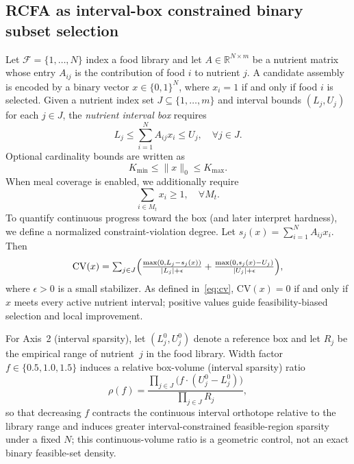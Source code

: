 \documentclass[lettersize,journal]{IEEEtran}
\begin{document}
\subsection{RCFA as interval-box constrained binary subset selection}
Let $\mathcal{F}=\{1,\ldots,N\}$ index a food library and let $A\in\mathbb{R}^{N\times m}$ be a nutrient matrix whose entry $A_{ij}$ is the contribution of food $i$ to nutrient $j$.
A candidate assembly is encoded by a binary vector $x\in\{0,1\}^N$, where $x_i=1$ if and only if food $i$ is selected.
Given a nutrient index set $J\subseteq\{1,\ldots,m\}$ and interval bounds $(L_j,U_j)$ for each $j\in J$, the \emph{nutrient interval box} requires\hspace{\fill}
\begin{equation}
\textstyle
L_j \le \sum_{i=1}^{N} A_{ij}x_i \le U_j,\quad \forall j\in J.
\end{equation}
Optional cardinality bounds are written as\hspace{\fill}
\begin{equation}
K_{\min}\le \|x\|_0\le K_{\max}.
\end{equation}
When meal coverage is enabled, we additionally require\hspace{\fill}
\begin{equation}
\textstyle
\sum_{i\in M_t} x_i \ge 1,\quad \forall M_t.
\label{eq:meal}
\end{equation}
To quantify continuous progress toward the box (and later interpret hardness), we define a normalized constraint-violation degree.
Let $s_j(x)=\sum_{i=1}^{N}A_{ij}x_i$. Then\hspace{\fill}
\begin{equation}
\textstyle
\mathrm{CV}(x)
=
\sum_{j\in J}
\Bigl(
\tfrac{\max(0,L_j-s_j(x))}{|L_j|+\epsilon}
+
\tfrac{\max(0,s_j(x)-U_j)}{|U_j|+\epsilon}
\Bigr),
\label{eq:cv}
\end{equation}
where $\epsilon>0$ is a small stabilizer.
As defined in~\eqref{eq:cv}, $\mathrm{CV}(x)=0$ if and only if $x$ meets every active nutrient interval; positive values guide feasibility-biased selection and local improvement.

For Axis~2 (interval sparsity), let $(L_j^0,U_j^0)$ denote a reference box and let $R_j$ be the empirical range of nutrient~$j$ in the food library.
Width factor $f\in\{0.5,1.0,1.5\}$ induces a relative box-volume (interval sparsity) ratio\hspace{\fill}
\begin{equation}
\textstyle
\rho(f)
=
\frac{\prod_{j\in J}\bigl(f\cdot(U_j^0-L_j^0)\bigr)}{\prod_{j\in J} R_j},
\label{eq:rho}
\end{equation}
so that decreasing $f$ contracts the continuous interval orthotope relative to the library range and induces greater interval-constrained feasible-region sparsity under a fixed $N$; this continuous-volume ratio is a geometric control, not an exact binary feasible-set density.
\end{document}
